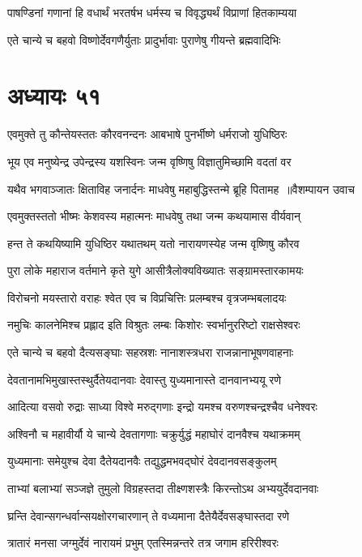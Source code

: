 \twolineshloka
{पाषण्डिनां गणानां हि वधार्थं भरतर्षभ}
{धर्मस्य च विवृद्ध्यर्थं विप्राणां हितकाम्यया}


\twolineshloka
{एते चान्ये च बहवो विष्णोर्देवगणैर्युताः}
{प्रादुर्भावाः पुराणेषु गीयन्ते ब्रह्मवादिभिः}


\chapter{अध्यायः ५१}
\twolineshloka
{एवमुक्ते तु कौन्तेयस्ततः कौरवनन्दनः}
{आबभाषे पुनर्भीष्णे धर्मराजो युधिष्ठिरः}


\twolineshloka
{भूय एव मनुष्येन्द्र उपेन्द्रस्य यशस्विनः}
{जन्म वृष्णिषु विज्ञातुमिच्छामि वदतां वर}


\threelineshloka
{यथैव भगवाञ्जातः क्षिताविह जनार्दनः}
{माधवेषु महाबुद्धिस्तन्मे ब्रूहि पितामह ॥वैशम्पायन उवाच}
{}


\twolineshloka
{एवमुक्तस्ततो भीष्मः केशवस्य महात्मनः}
{माधवेषु तथा जन्म कथयामास वीर्यवान्}


\twolineshloka
{हन्त ते कथयिष्यामि युधिष्ठिर यथातथम्}
{यतो नारायणस्येह जन्म वृष्णिषु कौरव}


\twolineshloka
{पुरा लोके महाराज वर्तमाने कृते युगे}
{आसीत्रैलोक्यविख्यातः सङ्ग्रामस्तारकामयः}


\twolineshloka
{विरोचनो मयस्तारो वराहः श्वेत एव च}
{विप्रचित्तिः प्रलम्बश्च वृत्रजम्भबलादयः}


\twolineshloka
{नमुचिः कालनेमिश्च प्रह्लाद इति विश्रुतः}
{लम्बः किशोरः स्वर्भानुररिष्टो राक्षसेश्वरः}


\twolineshloka
{एते चान्ये च बहवो दैत्यसङ्घाः सहस्रशः}
{नानाशस्त्रधरा राजन्नानाभूषणवाहनाः}


\twolineshloka
{देवतानामभिमुखास्तस्थुर्दैतेयदानवाः}
{देवास्तु युध्यमानास्ते दानवानभ्ययू रणे}


\twolineshloka
{आदित्या वसवो रुद्राः साध्या विश्वे मरुद्गणाः}
{इन्द्रो यमश्च वरुणश्चन्द्रश्चैव धनेश्वरः}


\twolineshloka
{अश्विनौ च महावीर्यौ ये चान्ये देवतागणाः}
{चक्रुर्युद्धं महाघोरं दानवैश्च यथाक्रमम्}


\twolineshloka
{युध्यमानाः समेयुश्च देवा दैतेयदानवैः}
{तद्युद्धमभवद्घोरं देवदानवसङ्कुलम्}


\twolineshloka
{ताभ्यां बलाभ्यां सञ्जज्ञे तुमुलो विग्रहस्तदा}
{तीक्ष्णशस्त्रैः किरन्तोऽथ अभ्ययुर्देवदानवाः}


\twolineshloka
{घ्रन्ति देवान्सगन्धर्वान्सयक्षोरगचारणान्}
{ते वध्यमाना दैतेयैर्देवसङ्घास्तदा रणे}


\twolineshloka
{त्रातारं मनसा जग्मुर्देवं नारायमं प्रभुम्}
{एतस्मिन्नन्तरे तत्र जगाम हरिरीश्वरः}


